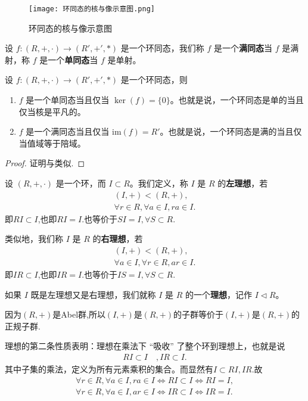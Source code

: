 \documentclass[../../main.tex]{subfiles}
\begin{document}
\begin{figure}[H]
\centering
\texttt{[image: 环同态的核与像示意图.png]}
\caption{环同态的核与像示意图}
\label{figure:环同态的核与像示意图}
\end{figure}

\begin{definition}[满同态与单同态]
设 $f:(R, +, \cdot) \to (R', +', *)$ 是一个环同态，我们称 $f$ 是一个\textbf{满同态}当 $f$ 是满射，称 $f$ 是一个\textbf{单同态}当 $f$ 是单射。 
\end{definition}

\begin{proposition}\label{proposition:一个环同态是单的当且仅当核是平凡的}
设  $f:(R, +, \cdot) \to (R', +', *)$ 是一个环同态，则
\begin{enumerate}
\item $f$ 是一个单同态当且仅当 $\ker(f)=\{0\}$。也就是说，一个环同态是单的当且仅当核是平凡的。

\item $f$ 是一个满同态当且仅当 $ \mathrm{im}(f)=R'$。也就是说，一个环同态是满的当且仅当值域等于陪域。
\end{enumerate}
\end{proposition}
\begin{proof}
证明与类似.
\end{proof}


\begin{definition}[理想]
设 $(R, +, \cdot)$ 是一个环，而 $I \subset R$。我们定义，称 $I$ 是 $R$ 的\textbf{左理想}，若
\begin{gather*}
(I, +) < (R, +),\\
\forall r \in R, \forall a \in I, ra \in I.
\end{gather*}
即$RI\subset I$,也即$RI=I.$也等价于$SI=I,\forall S\subset R$.

类似地，我们称 $I$ 是 $R$ 的\textbf{右理想}，若
\begin{gather*}
(I, +) < (R, +),\\
\forall a \in I, \forall r \in R, ar \in I.
\end{gather*}
即$IR\subset I$,也即$IR=I.$也等价于$IS=I,\forall S\subset R$.

如果 $I$ 既是左理想又是右理想，我们就称 $I$ 是 $R$ 的一个\textbf{理想}，记作 $I \lhd R$。 
\end{definition}
\begin{remark}
因为$(R,+)$是Abel群,所以$(I,+)是(R,+)$的子群等价于$(I,+)$是$(R,+)$的正规子群.
\end{remark}
\begin{note}
理想的第二条性质表明：理想在乘法下 “吸收” 了整个环到理想上，也就是说
\begin{align*}
RI \subset I\quad ,
IR \subset I.
\end{align*}
其中子集的乘法，定义为所有元素乘积的集合。而显然有$I\subset RI,IR$.故
\begin{gather*}
\forall r\in R,\forall a\in I,ra\in I\Leftrightarrow RI\subset I\Leftrightarrow RI=I,
\\
\forall r\in R,\forall a\in I,ar\in I\Leftrightarrow IR\subset I\Leftrightarrow IR=I.
\end{gather*}
\end{note}
\end{document}
